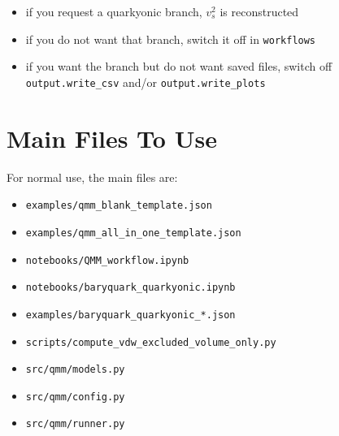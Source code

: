 \documentclass[11pt]{article}
\begin{document}
\begin{itemize}
\item if you request a quarkyonic branch, $v_s^2$ is reconstructed
\item if you do not want that branch, switch it off in \texttt{workflows}
\item if you want the branch but do not want saved files, switch off
\texttt{output.write\_csv} and/or \texttt{output.write\_plots}
\end{itemize}

\section{Main Files To Use}

For normal use, the main files are:

\begin{itemize}
\item \texttt{examples/qmm\_blank\_template.json}
\item \texttt{examples/qmm\_all\_in\_one\_template.json}
\item \texttt{notebooks/QMM\_workflow.ipynb}
\item \texttt{notebooks/baryquark\_quarkyonic.ipynb}
\item \texttt{examples/baryquark\_quarkyonic\_*.json}
\item \texttt{scripts/compute\_vdw\_excluded\_volume\_only.py}
\item \texttt{src/qmm/models.py}
\item \texttt{src/qmm/config.py}
\item \texttt{src/qmm/runner.py}
\end{itemize}
\end{document}
